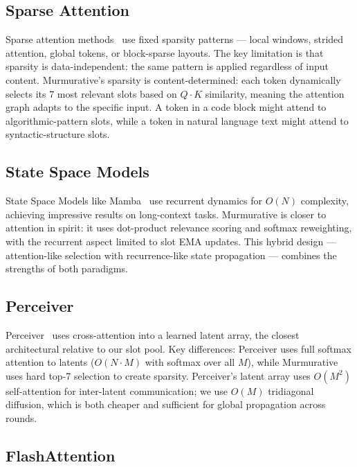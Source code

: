 \documentclass{article}
\begin{document}
\subsection{Sparse Attention}

Sparse attention methods~\cite{child2019sparse,beltagy2020longformer,zaheer2020bigbird} use fixed sparsity patterns — local windows, strided attention, global tokens, or block-sparse layouts. The key limitation is that sparsity is data-independent: the same pattern is applied regardless of input content. Murmurative's sparsity is content-determined: each token dynamically selects its 7 most relevant slots based on $Q \cdot K$ similarity, meaning the attention graph adapts to the specific input. A token in a code block might attend to algorithmic-pattern slots, while a token in natural language text might attend to syntactic-structure slots.

\subsection{State Space Models}

State Space Models like Mamba~\cite{gu2023mamba} use recurrent dynamics for $O(N)$ complexity, achieving impressive results on long-context tasks. Murmurative is closer to attention in spirit: it uses dot-product relevance scoring and softmax reweighting, with the recurrent aspect limited to slot EMA updates. This hybrid design — attention-like selection with recurrence-like state propagation — combines the strengths of both paradigms.

\subsection{Perceiver}

Perceiver~\cite{jaegle2021perceiver} uses cross-attention into a learned latent array, the closest architectural relative to our slot pool. Key differences: Perceiver uses full softmax attention to latents ($O(N \cdot M)$ with softmax over all $M$), while Murmurative uses hard top-7 selection to create sparsity. Perceiver's latent array uses $O(M^2)$ self-attention for inter-latent communication; we use $O(M)$ tridiagonal diffusion, which is both cheaper and sufficient for global propagation across rounds.

\subsection{FlashAttention}
\end{document}
